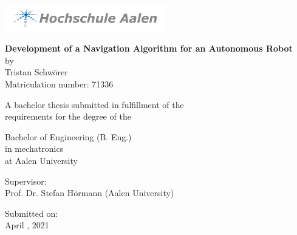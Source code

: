 \begin{titlepage}

\center\includegraphics[width=70mm]{Pictures/Logo_HSAA}

\vspace*{8mm} %
\begin{center} %
	
	\Huge\center\textbf{Development of a Navigation Algorithm for an Autonomous Robot}\\ %
	\vspace*{11mm}
	\Large{by}\\
	\Large{Tristan Schwörer}\\
	\Large{Matriculation number: 71336}\\
	
	\vspace*{11mm}
	
	\Large{A bachelor thesis submitted in fulfillment of the}\\
	\Large{requirements for the degree of the}\\
	
	\vspace*{11mm}
	
	\Large{Bachelor of Engineering (B. Eng.)}\\
	\Large{in mechatronics}\\
	\Large{at Aalen University}\\
	
	\vspace*{11mm}
	
	\Large{Supervisor:}\\
	\Large{Prof. Dr. Stefan Hörmann (Aalen University)}\\
	
	\vspace*{11mm}
	
	\Large{Submitted on:}\\
	\Large{April , 2021}\\
	
\end{center}
\end{titlepage}
